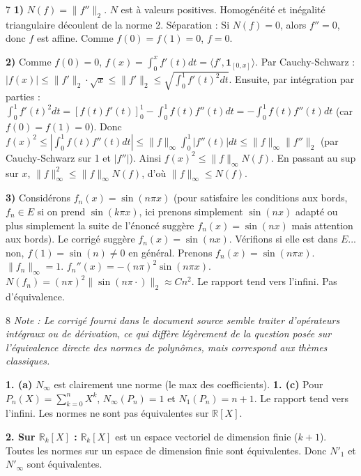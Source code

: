 \begin{correction}{7}
\textbf{1)} $N(f) = \|f''\|_2$. $N$ est à valeurs positives. Homogénéité et inégalité triangulaire découlent de la norme 2.
Séparation : Si $N(f)=0$, alors $f''=0$, donc $f$ est affine. Comme $f(0)=f(1)=0$, $f=0$.

\textbf{2)} Comme $f(0)=0$, $f(x) = \int_0^x f'(t) dt = \langle f', \mathbf{1}_{[0,x]} \rangle$.
Par Cauchy-Schwarz : $|f(x)| \le \|f'\|_2 \cdot \sqrt{x} \le \|f'\|_2 \le \sqrt{\int_0^1 f'(t)^2 dt}$.
Ensuite, par intégration par parties : $\int_0^1 f'(t)^2 dt = [f(t)f'(t)]_0^1 - \int_0^1 f(t)f''(t) dt = - \int_0^1 f(t)f''(t) dt$ (car $f(0)=f(1)=0$).
Donc $f(x)^2 \le \left| \int_0^1 f(t)f''(t) dt \right| \le \|f\|_\infty \int_0^1 |f''(t)| dt \le \|f\|_\infty \|f''\|_2$ (par Cauchy-Schwarz sur 1 et $|f''|$).
Ainsi $f(x)^2 \le \|f\|_\infty N(f)$.
En passant au sup sur $x$, $\|f\|_\infty^2 \le \|f\|_\infty N(f)$, d'où $\|f\|_\infty \le N(f)$.

\textbf{3)} Considérons $f_n(x) = \sin(n\pi x)$ (pour satisfaire les conditions aux bords, $f_n \in E$ si on prend $\sin(k\pi x)$, ici prenons simplement $\sin(nx)$ adapté ou plus simplement la suite de l'énoncé suggère $f_n(x) = \sin(nx)$ mais attention aux bords).
Le corrigé suggère $f_n(x) = \sin(nx)$. Vérifions si elle est dans $E$... non, $f(1)=\sin(n) \ne 0$ en général.
Prenons $f_n(x) = \sin(n\pi x)$.
$\|f_n\|_\infty = 1$.
$f_n''(x) = -(n\pi)^2 \sin(n\pi x)$. $N(f_n) = (n\pi)^2 \|\sin(n\pi \cdot)\|_2 \approx C n^2$.
Le rapport tend vers l'infini. Pas d'équivalence.
\end{correction}

\begin{correction}{8}
\textit{Note : Le corrigé fourni dans le document source semble traiter d'opérateurs intégraux ou de dérivation, ce qui diffère légèrement de la question posée sur l'équivalence directe des normes de polynômes, mais correspond aux thèmes classiques.}

\textbf{1. (a)} $N_\infty$ est clairement une norme (le max des coefficients).
\textbf{1. (c)} Pour $P_n(X) = \sum_{k=0}^n X^k$, $N_\infty(P_n) = 1$ et $N_1(P_n) = n+1$. Le rapport tend vers l'infini. Les normes ne sont pas équivalentes sur $\mathbb{R}[X]$.

\textbf{2. Sur $\mathbb{R}_k[X]$ :}
$\mathbb{R}_k[X]$ est un espace vectoriel de dimension finie ($k+1$).
Toutes les normes sur un espace de dimension finie sont équivalentes.
Donc $N'_1$ et $N'_\infty$ sont équivalentes.
\end{correction}

